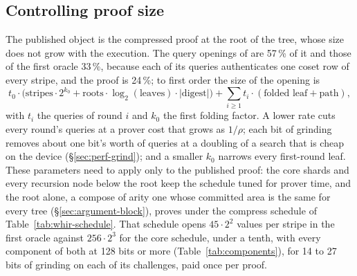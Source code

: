 \subsection{Controlling proof size}
\label{sec:perf-proofsize}

The published object is the compressed proof at the root of the tree, whose size does not grow with the execution. The query openings of \WHIR{} are 57\,\% of it and those of the first oracle 33\,\%, because each of its queries authenticates one coset row of every stripe, and the \LogUp{} proof is 24\,\%; to first order the size of the opening is
\[
  t_0 \cdot \big(\text{stripes} \cdot 2^{k_0} + \text{roots} \cdot \log_2(\text{leaves}) \cdot |\text{digest}|\big) + \textstyle\sum_{i \ge 1} t_i \cdot (\text{folded leaf} + \text{path}),
\]
with $t_i$ the queries of round $i$ and $k_0$ the first folding factor. A lower rate cuts every round's queries at a prover cost that grows as $1/\rho$; each bit of grinding removes about one bit's worth of queries at a doubling of a search that is cheap on the device (\S\ref{sec:perf-grind}); and a smaller $k_0$ narrows every first-round leaf. These parameters need to apply only to the published proof: the core shards and every recursion node below the root keep the schedule tuned for prover time, and the root alone, a compose of arity one whose committed area is the same for every tree (\S\ref{sec:argument-block}), proves under the compress schedule of Table~\ref{tab:whir-schedule}. That schedule opens $45 \cdot 2^{2}$ values per stripe in the first oracle against $256 \cdot 2^{3}$ for the core schedule, under a tenth, with every component of both at 128 bits or more (Table~\ref{tab:components}), for 14 to 27 bits of grinding on each of its challenges, paid once per proof.


